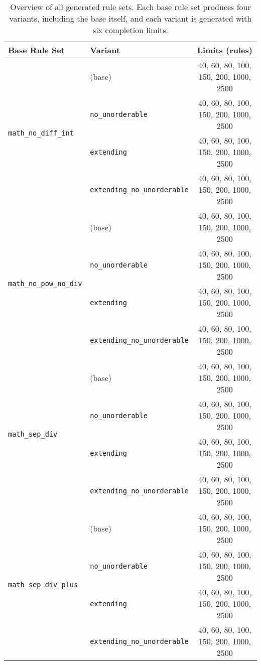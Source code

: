 \begin{table}[h]
	\centering
	\renewcommand{\arraystretch}{1.2}
	\begin{tabular}{llc}
		\toprule
		\textbf{Base Rule Set} & \textbf{Variant} & \textbf{Limits (rules)} \\
		\midrule
		\multirow{4}{*}{\texttt{math\_no\_diff\_int}} 
		& (base) & 40, 60, 80, 100, 150, 200, 1000, 2500 \\
		& \texttt{no\_unorderable} & 40, 60, 80, 100, 150, 200, 1000, 2500 \\
		& \texttt{extending} & 40, 60, 80, 100, 150, 200, 1000, 2500 \\
		& \texttt{extending\_no\_unorderable} & 40, 60, 80, 100, 150, 200, 1000, 2500 \\
		\midrule
		\multirow{4}{*}{\texttt{math\_no\_pow\_no\_div}} 
		& (base) & 40, 60, 80, 100, 150, 200, 1000, 2500 \\
		& \texttt{no\_unorderable} & 40, 60, 80, 100, 150, 200, 1000, 2500 \\
		& \texttt{extending} & 40, 60, 80, 100, 150, 200, 1000, 2500 \\
		& \texttt{extending\_no\_unorderable} & 40, 60, 80, 100, 150, 200, 1000, 2500 \\
		\midrule
		\multirow{4}{*}{\texttt{math\_sep\_div}} 
		& (base) & 40, 60, 80, 100, 150, 200, 1000, 2500 \\
		& \texttt{no\_unorderable} & 40, 60, 80, 100, 150, 200, 1000, 2500 \\
		& \texttt{extending} & 40, 60, 80, 100, 150, 200, 1000, 2500 \\
		& \texttt{extending\_no\_unorderable} & 40, 60, 80, 100, 150, 200, 1000, 2500 \\
		\midrule
		\multirow{4}{*}{\texttt{math\_sep\_div\_plus}} 
		& (base) & 40, 60, 80, 100, 150, 200, 1000, 2500 \\
		& \texttt{no\_unorderable} & 40, 60, 80, 100, 150, 200, 1000, 2500 \\
		& \texttt{extending} & 40, 60, 80, 100, 150, 200, 1000, 2500 \\
		& \texttt{extending\_no\_unorderable} & 40, 60, 80, 100, 150, 200, 1000, 2500 \\
		\bottomrule
	\end{tabular}
	\caption{Overview of all generated rule sets. Each base rule set produces four variants, including the base itself, and each variant is generated with six completion limits.}
	\label{tab:rule-sets-overview}
\end{table}

